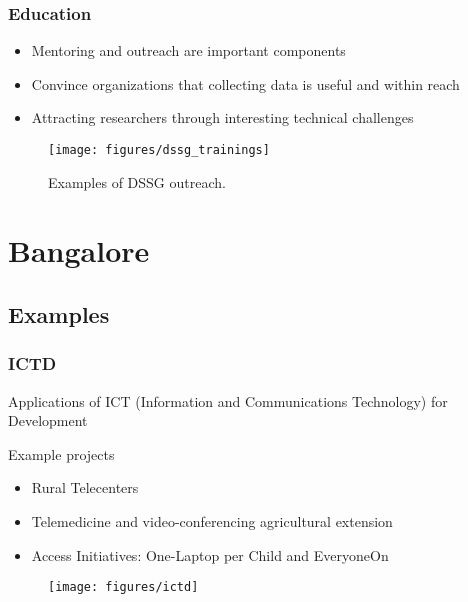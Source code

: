 \documentclass[10pt,mathserif]{beamer}
\begin{document}
\begin{frame}
  \frametitle{Education}
  \begin{itemize}
  \item Mentoring and outreach are important components
  \item Convince organizations that collecting data is useful and within reach
  \item Attracting researchers through interesting technical challenges
  \end{itemize}
\begin{figure}[ht]
  \centering
  \texttt{[image: figures/dssg\_trainings]}
  \caption{Examples of DSSG outreach. \label{fig:label} }
\end{figure}

\end{frame}

\section{Bangalore}
\label{sec:bangalore}

\subsection{Examples}
\label{subsec:label}

\begin{frame}
  \frametitle{ICTD}
    \item Applications of ICT (Information and Communications Technology) for
      Development
    \item Example projects
      \begin{itemize}
      \item Rural Telecenters
      \item Telemedicine and video-conferencing agricultural extension
      \item Access Initiatives: One-Laptop per Child and EveryoneOn
      \end{itemize}
\begin{figure}[ht]
  \centering
  \texttt{[image: figures/ictd]}
\end{figure}

\end{frame}
\end{document}
